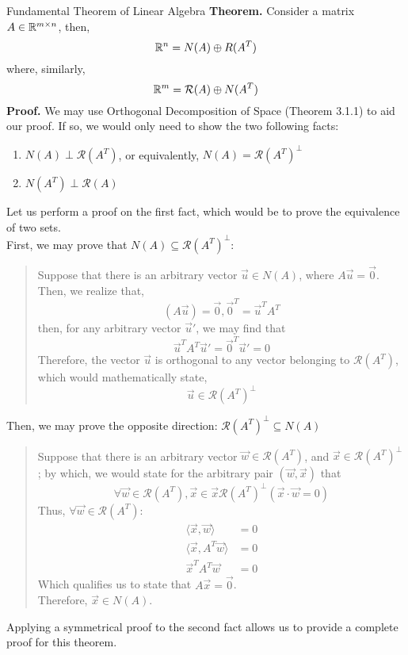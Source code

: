 \begin{ln-theorem}{Fundamental Theorem of Linear Algebra}{}
    \textbf{Theorem.} Consider a matrix $A \in \mathbb{R}^{m \times n}$, then,
    \[\mathbb{R}^n = N(A) \oplus R(A^T)\]
    where, similarly,
    \[\mathbb{R}^m = \mathcal{R}(A) \oplus N(A^T)\]
    \tcblower
    \textbf{Proof.} We may use Orthogonal Decomposition of Space (Theorem 3.1.1) to aid our proof. If so, we would only need to show the two following facts:
    \begin{enumerate}
        \item $N(A) \perp \mathcal{R}(A^T)$, or equivalently, $N(A) = \mathcal{R}(A^T)^\perp$
        \item $N(A^T) \perp \mathcal{R}(A)$
    \end{enumerate}
    Let us perform a proof on the first fact, which would be to prove the equivalence of two sets. \\
    First, we may prove that $N(A) \subseteq \mathcal{R}(A^T)^\perp$:
    \begin{quote}
        Suppose that there is an arbitrary vector $\vec{u} \in N(A)$, where $A \vec{u} = \vec{0}$. \\
        Then, we realize that,
        \[(A \vec{u}) = \vec{0}, \vec{0}^T = \vec{u}^T A^T\]
        then, for any arbitrary vector $\vec{u}'$, we may find that
        \[\vec{u}^T A^T \vec{u}' = \vec{0}^T \vec{u}' = 0\]
        Therefore, the vector $\vec{u}$ is orthogonal to any vector belonging to $\mathcal{R}(A^T)$, which would mathematically state,
        \[\vec{u} \in \mathcal{R}(A^T)^\perp\]
    \end{quote}
    Then, we may prove the opposite direction: $\mathcal{R}(A^T)^\perp \subseteq N(A)$
    \begin{quote}
        Suppose that there is an arbitrary vector $\vec{w} \in \mathcal{R}(A^T)$, and $\vec{x} \in \mathcal{R}(A^T)^\perp$; by which, we would state for the arbitrary pair $(\vec{w}, \vec{x})$ that
        \[
            \forall \vec{w} \in \mathcal{R}(A^T), \vec{x} \in \vec{x} \mathcal{R}(A^T)^\perp (\vec{x} \cdot \vec{w} = 0)
        \]
        Thus, $\forall \vec{w} \in \mathcal{R}(A^T)$:
        \begin{align*}
            \langle \vec{x}, \vec{w} \rangle &= 0 \\
            \langle \vec{x}, A^T \vec{w} \rangle &= 0 \\
            \vec{x}^T A^T \vec{w} &= 0
        \end{align*}
        Which qualifies us to state that $A \vec{x} = \vec{0}$. \\
        Therefore, $\vec{x} \in N(A)$.
    \end{quote}
    Applying a symmetrical proof to the second fact allows us to provide a complete proof for this theorem.
\end{ln-theorem}

